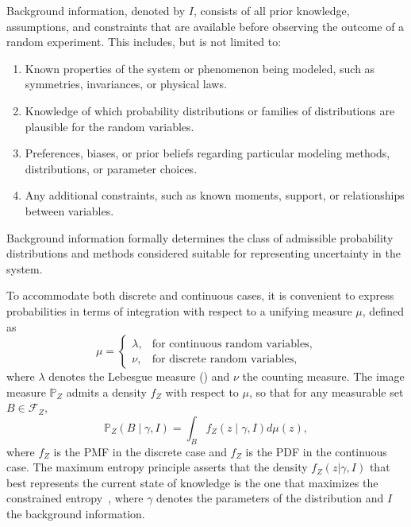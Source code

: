 \begin{definition}
	\label{def:background_information}
	Background information, denoted by $I$, consists of all prior knowledge, assumptions, and constraints that are available before observing the outcome of a random experiment. This includes, but is not limited to:
	\begin{enumerate}
		\item Known properties of the system or phenomenon being modeled, such as symmetries, invariances, or physical laws.
		\item Knowledge of which probability distributions or families of distributions are plausible for the random variables.
		\item Preferences, biases, or prior beliefs regarding particular modeling methods, distributions, or parameter choices.
		\item Any additional constraints, such as known moments, support, or relationships between variables.
	\end{enumerate}
	Background information formally determines the class of admissible probability distributions and methods considered suitable for representing uncertainty in the system.
\end{definition}

To accommodate both discrete and continuous cases, it is convenient to express probabilities in terms of integration with respect to a unifying measure $\mu$, defined as
\begin{equation}
	\mu = 
	\begin{cases}
		\lambda, & \text{for continuous random variables},\\
		\nu, & \text{for discrete random variables,}
	\end{cases}
\end{equation}
where $\lambda$ denotes the Lebesgue measure () and $\nu$ the counting measure. The image measure $\mathbb{P}_Z$ admits a density $f_Z$ with respect to $\mu$, so that for any measurable set $B\in \mathcal{F}_Z$,
\begin{equation}
	\mathbb{P}_Z(B \mid\gamma,I) = \int_B f_Z(z\mid \gamma,I) d\mu(z),
	\label{eq:max_ent_probability_measure}
\end{equation}
where $f_Z$ is the PMF in the discrete case and $f_Z$ is the PDF in the continuous case. The maximum entropy principle asserts that the density $f_Z(z | \gamma, I)$ that best represents the current state of knowledge is the one that maximizes the constrained entropy~\citep{Sivia2006}, where $\gamma$ denotes the parameters of the distribution and $I$ the background information. 


